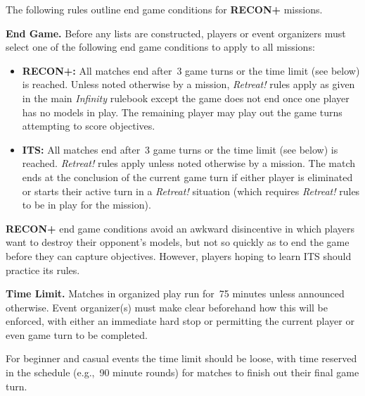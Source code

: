 \documentclass[14pt,dvipsnames]{extarticle}
\newcommand{\missionrule}[1]{\noindent\textbf{#1}\xspace}
\newcommand{\reconplus}{\textbf{RECON+}\xspace}
\begin{document}
The following rules outline end game conditions for \reconplus
missions.

\missionrule{End Game.}  Before any lists are constructed, players or
event organizers must select one of the following end game conditions
to apply to all missions:

\vspace{-1em}
\begin{itemize}
\item \textbf{RECON+:} All matches end after~3 game turns or the time
  limit (see below) is reached.  Unless noted otherwise by a mission,
  \emph{Retreat!} rules apply as given in the main \emph{Infinity}
  rulebook except the game does not end once one player has no models
  in play.  The remaining player may play out the game turns
  attempting to score objectives.

\item \textbf{ITS:} All matches end after~3 game turns or the time
  limit (see below) is reached.  \emph{Retreat!} rules apply unless
  noted otherwise by a mission.  The match ends at the conclusion of
  the current game turn if either player is eliminated or starts their
  active turn in a \emph{Retreat!} situation (which requires
  \emph{Retreat!} rules to be in play for the mission).
\end{itemize}

\vspace{-1em}
\begin{recon}
  \reconplus end game conditions avoid an awkward disincentive in
  which players want to destroy their opponent's models, but not so
  quickly as to end the game before they can capture objectives.
  However, players hoping to learn ITS should practice its rules.
\end{recon}


\missionrule{Time Limit.} Matches in organized play run for~75 minutes
unless announced otherwise.  Event organizer(s) must make clear
beforehand how this will be enforced, with either an immediate hard
stop or permitting the current player or even game turn to be
completed.

\begin{recon}
  For beginner and casual events the time limit should be loose, with
  time reserved in the schedule (e.g.,~90 minute rounds) for matches
  to finish out their final game turn.
\end{recon}
\end{document}
